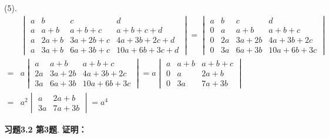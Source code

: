 (5). 
\begin{align*}
& \begin{vmatrix} a & b & c & d \\ a & a+b & a+b+c & a+b+c+d \\ a & 2a+b & 3a+2b+c & 4a+3b+2c+d \\ a & 3a+b & 6a+3b+c & 10a+6b+3c+d \end{vmatrix} = \begin{vmatrix} a & b & c & d \\ 0 & a & a+b & a+b+c \\ 0 & 2a & 3a+2b & 4a+3b+2c \\ 0 & 3a & 6a+3b & 10a+6b+3c \end{vmatrix} \\
= & a \begin{vmatrix} a & a+b & a+b+c \\ 2a & 3a+2b & 4a+3b+2c \\ 3a & 6a+3b & 10a+6b+3c \end{vmatrix} = a \begin{vmatrix} a & a+b & a+b+c \\ 0 & a & 2a+b \\ 0 & 3a & 7a+3b \end{vmatrix} \\
= & a^2 \begin{vmatrix} a & 2a+b \\ 3a & 7a+3b \end{vmatrix} = a^4
\end{align*}

\newpageorvspace

{\bf 习题3.2 第3题}. {\bf 证明：}

